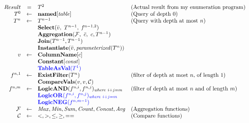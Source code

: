 \documentclass[letter, notitlepage]{article}
\begin{document}
\[
\begin{array}{rcll}
	Result & = & T^{2} & {\text{(Actual result from my enumeration program)}}\\
	T^{0} & \leftarrow & \mathbf{named}[\mathit{table}] & \text{(Query of depth $0$)}\\
	T^{n} & \leftarrow & T^{n-1} & \text{(Query with depth at most $n$)}\\
				& & \mathbf{Select}(\bar{v},~T^{n-1},~\mathit{f}^{n-1,2} )\\
				& &  \mathbf{Aggregation}(\mathcal{F},~\bar{c},~c,T^{n-1})\\
				& & \mathbf{Join}(T^{n-1}, T^{n-1})\\
				& & \mathbf{Instantiate}(\bar{v}, \mathit{parameterized}(T^n))\\
	v & \leftarrow & \mathbf{ColumnName}[c] \\
		& & \mathbf{Constant}[\mathit{const}] \\
		& & \color{blue} \mathbf{TableAsVal}(T^1)\\
	f^{n,1} & \leftarrow & \mathbf{ExistFilter}(T^n) & (\text{filter of depth at most $n$, of length $1$})\\
					& & \mathbf{CompareVals}(v, v, \mathcal{C})\\
	f^{n,m} & \leftarrow & \mathbf{LogicAND}(f^{n, i}, f^{n,j})_{\mathit{where}~i+j=m} & (\text{filter of depth at most $n$ and of length $m$})\\
					& & \color{blue} \mathbf{LogicOR}(f^{n, i}, f^{n,j})_{\mathit{where}~i+j=m}\\
					& & \color{blue} \mathbf{LogicNEG}(f^{n, m-1})\\
	\mathcal{F} & \leftarrow & \mathit{Max}, \mathit{Min}, \mathit{Sum}, \mathit{Count}, \mathit{Concat}, \mathit{Avg} & \text{(Aggregation functions)}\\
	\mathcal{C} & \leftarrow & <, >, \le, \ge, == & \text{(Compare functions)} 
\end{array}
\]
\end{document}
